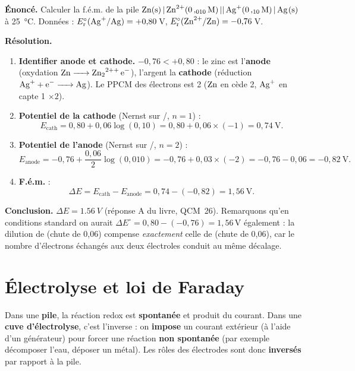 \documentclass[11pt,a4paper]{article}
\newcommand{\degner}[1]{\ensuremath{E_{\mathrm{r}}^{\circ}(#1)}}  %
\newcommand{\fem}{\ensuremath{\Delta E}}        %
\begin{document}
\begin{exemple}
\textbf{Énoncé.} Calculer la f.é.m. de la pile
$\ce{Zn(s) | Zn^{2+}(0{,}010\,M) || Ag+(0{,}10\,M) | Ag(s)}$ à \SI{25}{\celsius}.
Données : $\degner{\ce{Ag+}/\ce{Ag}}=+0{,}80$\,V, $\degner{\ce{Zn^{2+}}/\ce{Zn}}=-0{,}76$\,V.

\textbf{Résolution.}
\begin{enumerate}[label=\textbf{\arabic*.},leftmargin=2.2em,topsep=1pt,itemsep=2pt]
  \item \textbf{Identifier anode et cathode.} $-0{,}76<+0{,}80$ : le zinc est l'\textbf{anode}
        (oxydation $\ce{Zn -> Zn^{2+}+2 e^-}$), l'argent la \textbf{cathode}
        (réduction $\ce{Ag+ + e^- -> Ag}$). Le PPCM des électrons est 2
        ($\ce{Zn}$ en cède 2, $\ce{Ag+}$ en capte 1 $\times 2$).
  \item \textbf{Potentiel de la cathode} (Nernst sur /, $n=1$) :
        \[
        E_{\text{cath}}=0{,}80+0{,}06\log(0{,}10)=0{,}80+0{,}06\times(-1)=0{,}74\ \mathrm{V}.
        \]
  \item \textbf{Potentiel de l'anode} (Nernst sur /, $n=2$) :
        \[
        E_{\text{anode}}=-0{,}76+\frac{0{,}06}{2}\log(0{,}010)
        =-0{,}76+0{,}03\times(-2)=-0{,}76-0{,}06=-0{,}82\ \mathrm{V}.
        \]
  \item \textbf{F.é.m.} :
        \[
        \fem=E_{\text{cath}}-E_{\text{anode}}=0{,}74-(-0{,}82)=1{,}56\ \mathrm{V}.
        \]
\end{enumerate}
\textbf{Conclusion.} $\fem=\SI{1.56}{V}$ (réponse A du livre, QCM~26). Remarquons qu'en conditions
standard on aurait $\fem^{\circ}=0{,}80-(-0{,}76)=1{,}56$\,V également : la dilution de 
(chute de 0{,}06) compense \emph{exactement} celle de  (chute de 0{,}06), car le nombre
d'électrons échangés aux deux électroles conduit au même décalage.
\end{exemple}

\section{Électrolyse et loi de Faraday}

Dans une \textbf{pile}, la réaction redox est \textbf{spontanée} et produit du courant. Dans une
\textbf{cuve d'électrolyse}, c'est l'inverse : on \textbf{impose} un courant extérieur (à l'aide
d'un générateur) pour forcer une réaction \textbf{non spontanée} (par exemple décomposer l'eau,
déposer un métal). Les rôles des électrodes sont donc \textbf{inversés} par rapport à la pile.
\end{document}
